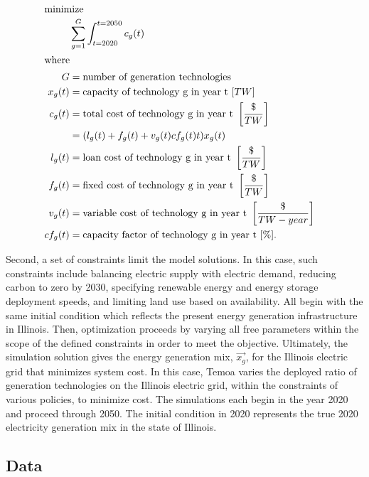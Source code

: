 \begin{align}
\intertext{minimize} 
        &\sum_{g=1}^G\int_{t=2020}^{t=2050} c_g(t)\\
\intertext{where}
        G&=\text{number of generation technologies}&\nonumber\\
        x_g(t)&=\text{capacity of technology g in year t }[TW] &\nonumber\\
        c_g(t)&=\text{total cost of technology g in year t }\left[\frac{\$}{TW}\right]&\nonumber\\
              &= (l_g(t) + f_g(t) + v_g(t)cf_g(t)t)x_g(t)\nonumber\\
        l_g(t)&=\text{loan cost of technology g in year t }\left[\frac{\$}{TW}\right]&\nonumber\\
        f_g(t)&=\text{fixed cost of technology g in year t }\left[\frac{\$}{TW}\right]&\nonumber\\
        v_g(t)&=\text{variable cost of technology g in year t }\left[\frac{\$}{TW-year}\right]&\nonumber\\
        cf_g(t)&=\text{capacity factor of technology g in year t }[\%] .&\nonumber
\end{align}

Second, a set of constraints limit the model solutions. In this case, such 
constraints include balancing electric supply with electric demand, reducing 
carbon to zero by 2030, specifying renewable energy and energy
storage deployment speeds, and limiting land use based on availability.
All begin with the same initial condition which reflects the present energy generation infrastructure in Illinois. 
Then, optimization 
proceeds by varying all free parameters within the scope of the defined 
constraints in order to meet the objective. Ultimately, the simulation solution 
gives the energy generation mix, $\vec{x_g}$, for the Illinois electric grid that minimizes system cost. 
In this case, Temoa varies the 
deployed ratio of generation technologies on the Illinois electric grid, within 
the constraints of various policies, to minimize cost. The simulations each 
begin in the year 2020 and proceed through 2050.  The initial condition in 2020 
represents the true 2020 electricity generation mix in the state of Illinois.

\FloatBarrier
\subsection{Data}

